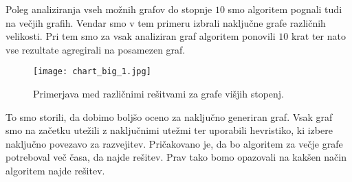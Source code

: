 \documentclass[12pt,a4paper,twoside]{article}
\theoremstyle{definition} %
\theoremstyle{plain} %
\numberwithin{equation}{section}  %
\begin{document}
Poleg analiziranja vseh možnih grafov do stopnje $10$ smo algoritem pognali tudi na večjih grafih. Vendar smo v tem primeru izbrali naključne grafe različnih velikosti. Pri tem smo za vsak analiziran graf algoritem ponovili $10$ krat ter nato vse rezultate agregirali na posamezen graf.
 \begin{figure}[h!]
\caption{Primerjava med različnimi rešitvami za grafe višjih stopenj.}
\label{chart_big_1}
\centering
    \texttt{[image: chart\_big\_1.jpg]}
    \end{figure}
To smo storili, da dobimo boljšo oceno za naključno generiran graf. Vsak graf smo na začetku utežili z naključnimi utežmi ter uporabili hevristiko, ki izbere naključno povezavo za razvejitev. Pričakovano je, da bo algoritem za večje grafe potreboval več časa, da najde rešitev. Prav tako bomo opazovali na kakšen način algoritem najde rešitev. 
\end{document}
